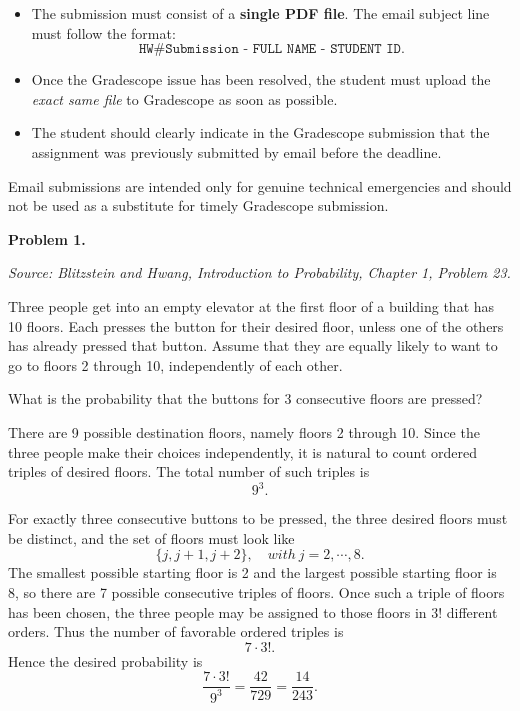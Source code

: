 \documentclass[11pt]{article}
\newcommand{\source}[1]{%
    \vspace{0.15cm}
    {\small\textit{Source: Blitzstein and Hwang, \textit{Introduction to Probability}, Chapter 1, Problem #1.}}
}
\begin{document}
\begin{itemize}[leftmargin=*]
    \item The submission must consist of a \textbf{single PDF file}. The email subject line must follow the format:
    \[
    \texttt{HW\# Submission - FULL NAME - STUDENT ID}.
    \]
    \item Once the Gradescope issue has been resolved, the student must upload the \emph{exact same file} to Gradescope as soon as possible.
    \item The student should clearly indicate in the Gradescope submission that the assignment was previously submitted by email before the deadline.
\end{itemize}

Email submissions are intended only for genuine technical emergencies and should not be used as a substitute for timely Gradescope submission.

\newpage



\begin{problemheader}
\textbf{Problem 1.} \hfill 
\end{problemheader}
\source{23}

Three people get into an empty elevator at the first floor of a building that has 10 floors. Each presses the button for their desired floor, unless one of the others has already pressed that button. Assume that they are equally likely to want to go to floors 2 through 10, independently of each other.

What is the probability that the buttons for 3 consecutive floors are pressed?

\begin{solutionbox}
There are 9 possible destination floors, namely floors 2 through 10. Since the three people make their choices independently, it is natural to count ordered triples of desired floors. The total number of such triples is
\[
9^3.
\]

For exactly three consecutive buttons to be pressed, the three desired floors must be distinct, and the set of floors must look like
\[
\{j,j+1,j+2\}, \quad with \ j=2,\cdots, 8.
\]
The smallest possible starting floor is 2 and the largest possible starting floor is 8, so there are 7 possible consecutive triples of floors. Once such a triple of floors has been chosen, the three people may be assigned to those floors in \(3!\) different orders. Thus the number of favorable ordered triples is
\[
7\cdot 3!.
\]
Hence the desired probability is
\[
\frac{7\cdot 3!}{9^3}
=
\frac{42}{729}
=
\frac{14}{243}.
\]

\end{solutionbox}
\newpage
\end{document}
